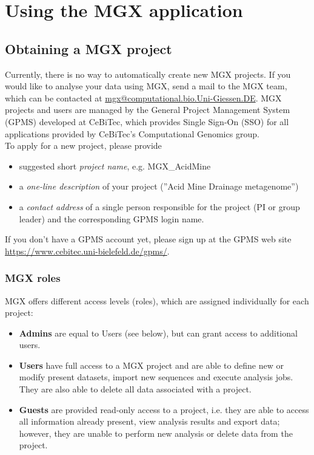 
\chapter{Using the MGX application}
\label{using}


\section{Obtaining a MGX project}

Currently, there is no way to automatically create new MGX projects. If you would like to
analyse your data using MGX, send a mail to the MGX team, which can be contacted at 
\href{mailto:mgx@computational.bio.Uni-Giessen.DE}{mgx@computational.bio.Uni-Giessen.DE}. MGX projects
and users are managed by the General Project Management System (GPMS) developed at CeBiTec,
which provides Single Sign-On (SSO) for all applications provided by CeBiTec's Computational
Genomics group.\\

To apply for a new project, please provide

\begin{itemize}
  \item suggested short \textit{project name}, e.g. MGX\_AcidMine
  \item a \textit{one-line description} of your project (''Acid Mine Drainage metagenome'')
  \item a \textit{contact address} of a single person responsible for the project (PI or group leader)
and the corresponding GPMS login name.
\end{itemize}

If you don't have a GPMS account yet, please sign up at the GPMS web site \url{https://www.cebitec.uni-bielefeld.de/gpms/}.

\subsection{MGX roles}

MGX offers different access levels (roles), which are assigned individually for each
project: \\

\begin{itemize}
  \item{\textbf{Admins} are equal to Users (see below), but can grant access to additional users.}
  \item \textbf{Users} have full access to a MGX project and are able to define new or modify
present datasets, import new sequences and execute analysis jobs. They are also able to
delete all data associated with a project.
  \item \textbf{Guests} are provided read-only access to a project, i.e. they are able to access
all information already present, view analysis results and export data; however, they are
unable to perform new analysis or delete data from the project.
\end{itemize}

